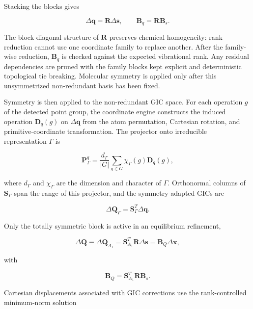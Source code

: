 \documentclass[journal=jctcce,manuscript=article,maxauthors=999]{achemso}
\begin{document}
Stacking the blocks gives

\begin{equation}
\Delta \mathbf{q}
=
\mathbf{R}
\Delta \mathbf{s},
\qquad
\mathbf{B}_{q}
=
\mathbf{R}
\mathbf{B}_s .
\end{equation}

The block-diagonal structure of $\mathbf{R}$ preserves chemical homogeneity:
rank reduction cannot use one coordinate family to replace another. After the
family-wise reduction, $\mathbf{B}_q$ is checked against the expected
vibrational rank. Any residual dependencies are pruned with the family blocks
kept explicit and deterministic topological tie breaking. Molecular symmetry
is applied only after this unsymmetrized non-redundant basis has been fixed.

Symmetry is then applied to the non-redundant GIC space. For each operation
$g$ of the detected point group, the coordinate engine constructs the induced
operation $\mathbf{D}_q(g)$ on $\Delta\mathbf{q}$ from the atom permutation,
Cartesian rotation, and primitive-coordinate transformation. The projector
onto irreducible representation $\Gamma$ is

\begin{equation}
\mathbf{P}^{q}_{\Gamma}
=
\frac{d_{\Gamma}}{|G|}
\sum_{g\in G}
\chi_{\Gamma}(g)
\mathbf{D}_q(g),
\end{equation}

where $d_{\Gamma}$ and $\chi_{\Gamma}$ are the dimension and character of
$\Gamma$. Orthonormal columns of $\mathbf{S}_{\Gamma}$ span the range of this
projector, and the symmetry-adapted GICs are

\begin{equation}
\Delta \mathbf{Q}_{\Gamma}
=
\mathbf{S}_{\Gamma}^{T}
\Delta \mathbf{q}.
\end{equation}

Only the totally symmetric block is active in an equilibrium refinement,

\begin{equation}
\Delta \mathbf{Q}
\equiv
\Delta \mathbf{Q}_{A_1}
=
\mathbf{S}_{A_1}^{T}
\mathbf{R}
\Delta \mathbf{s}
=
\mathbf{B}_{Q}
\Delta \mathbf{x},
\end{equation}

with

\begin{equation}
\mathbf{B}_{Q}
=
\mathbf{S}_{A_1}^{T}
\mathbf{R}
\mathbf{B}_s .
\end{equation}

Cartesian displacements associated with GIC corrections use the
rank-controlled minimum-norm solution
\end{document}
